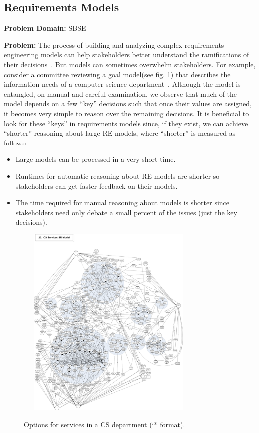 \documentclass[table, xcdraw, sigconf,review, anonymous]{acmart}
\begin{document}
\subsection{Requirements Models}
    \textbf{Problem Domain: } SBSE
    
    \noindent\textbf{Problem:} The process of building and analyzing complex requirements engineering models can help stakeholders better understand the ramifications of their decisions~\cite{Lamsweerde2001,amyot10}. But models can sometimes overwhelm stakeholders. For example, consider a committee reviewing a goal model(see fig. \ref{fig:csServices}) that describes the information needs of a computer science department~\cite{Horkoff2016}. Although the model is entangled, on manual and careful examination, we observe that much of the model depends on a few ``key'' decisions such that once their values are assigned, it becomes very simple to reason over the remaining decisions. It is beneficial to look for these ``keys'' in requirements models since, if they exist, we can achieve ``shorter'' reasoning about large RE models, where ``shorter'' is measured as follows:
    \begin{itemize}
     \item{Large models can be processed in a very short time.}
     \item{Runtimes for automatic reasoning about RE models are shorter so stakeholders can get faster feedback on their models.}
     \item{The time required for manual reasoning about models is shorter since stakeholders need only debate a small percent of the issues (just the key decisions).}
    \end{itemize}
   
    
    \begin{figure}[!t] 
  ~~~\includegraphics[width=3.1in]{img/CSServices.pdf} 
    \caption{Options for services in a CS department (i* format).}
    \label{fig:csServices}
\end{figure}
\end{document}
